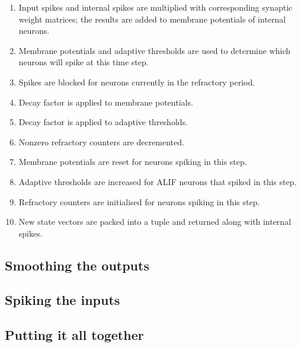 \documentclass[../../report.tex]{subfiles}
\begin{document}
\begin{enumerate}

  \item Input spikes and internal spikes are multiplied with corresponding
  synaptic weight matrices; the results are added to membrane potentials of
  internal neurons.

  \item Membrane potentials and adaptive thresholds are used to determine which
  neurons will spike at this time step.

  \item Spikes are blocked for neurons currently in the refractory period.

  \item Decay factor is applied to membrane potentials.

  \item Decay factor is applied to adaptive thresholds.

  \item Nonzero refractory counters are decremented.

  \item Membrane potentials are reset for neurons spiking in this step.

  \item Adaptive thresholds are increased for ALIF neurons that spiked in this
  step.

  \item Refractory counters are initialised for neurons spiking in this step.

  \item New state vectors are packed into a tuple and returned along with
  internal spikes.

\end{enumerate}

\subsection{Smoothing the outputs}

\subsection{Spiking the inputs}

\subsection{Putting it all together}
\end{document}
